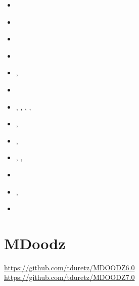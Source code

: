 \begin{small}
\begin{itemize}
\item[\nineteenninetyone]    \textcite{gaot91}
\item[\nineteenninetynine]   \textcite{loga99}
\item[\twothousandone]       \textcite{lokg01}
\item[\twothousandthree]     \textcite{lokg03}
\item[\twothousandfour]      \textcite{thkl04},  \textcite{lokg04}
\item[\twothousandfive]      \textcite{kogk05} 
\item[\twothousandseven]     \textcite{galo07},  \textcite{galo07b}, \textcite{nelo07},
                             \textcite{jalo07},  \textcite{lopk07}
\item[\twothousandeight]     \textcite{galg08},  \textcite{logg08}
\item[\twothousandten]       \textcite{helo10},  \textcite{oflo10}
\item[\twothousandeleven]    \textcite{stfl11},  \textcite{helo11},  \textcite{lokt11}
\item[\twothousandfourteen]  \textcite{trhs14}
\item[\twothousandfifteen]   \textcite{tosn15},  \textcite{hels15}
\item[\twothousandsixteen]   \textcite{trlo16}
\end{itemize}
\end{small} 



\section{MDoodz}

\url{https://github.com/tduretz/MDOODZ6.0}
\url{https://github.com/tduretz/MDOODZ7.0}


